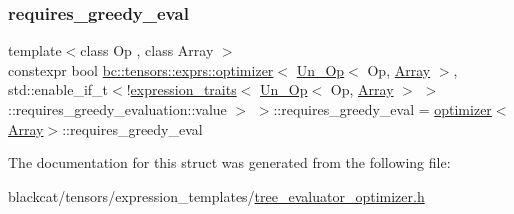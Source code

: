 \subsubsection{\texorpdfstring{requires\+\_\+greedy\+\_\+eval}{requires\_greedy\_eval}}
{\footnotesize\ttfamily template$<$class Op , class Array $>$ \\
constexpr bool \hyperlink{structbc_1_1tensors_1_1exprs_1_1optimizer}{bc\+::tensors\+::exprs\+::optimizer}$<$ \hyperlink{structbc_1_1tensors_1_1exprs_1_1Un__Op}{Un\+\_\+\+Op}$<$ Op, \hyperlink{structbc_1_1tensors_1_1exprs_1_1Array}{Array} $>$, std\+::enable\+\_\+if\+\_\+t$<$!\hyperlink{structbc_1_1tensors_1_1exprs_1_1expression__traits}{expression\+\_\+traits}$<$ \hyperlink{structbc_1_1tensors_1_1exprs_1_1Un__Op}{Un\+\_\+\+Op}$<$ Op, \hyperlink{structbc_1_1tensors_1_1exprs_1_1Array}{Array} $>$ $>$ \+::requires\+\_\+greedy\+\_\+evaluation\+::value $>$ $>$\+::requires\+\_\+greedy\+\_\+eval = \hyperlink{structbc_1_1tensors_1_1exprs_1_1optimizer}{optimizer}$<$\hyperlink{structbc_1_1tensors_1_1exprs_1_1Array}{Array}$>$\+::requires\+\_\+greedy\+\_\+eval\hspace{0.3cm}{\ttfamily [static]}}



The documentation for this struct was generated from the following file\+:\begin{DoxyCompactItemize}
\item 
blackcat/tensors/expression\+\_\+templates/\hyperlink{tree__evaluator__optimizer_8h}{tree\+\_\+evaluator\+\_\+optimizer.\+h}\end{DoxyCompactItemize}

